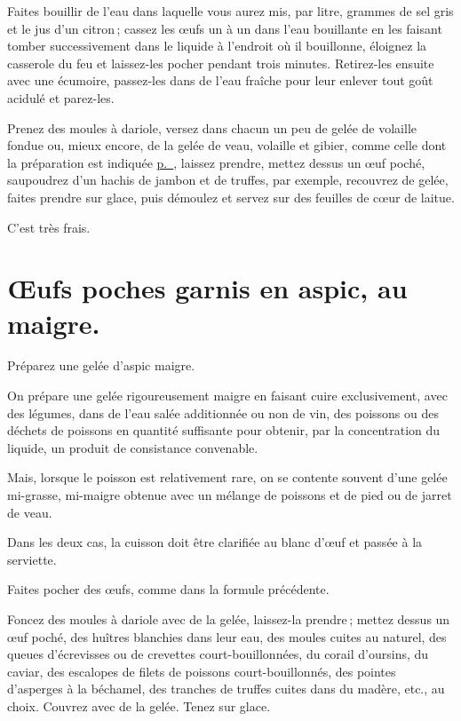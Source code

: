Faites bouillir de l'eau dans laquelle vous aurez mis, par litre, {\mmm}
grammes de sel gris et le jus d'un citron ; cassez les œufs un à un dans l’eau
bouillante en les faisant tomber successivement dans le liquide à l'endroit où
il bouillonne, éloignez la casserole du feu et laissez-les pocher pendant trois
minutes. Retirez-les ensuite avec une écumoire, passez-les dans de l’eau
fraîche pour leur enlever tout goût acidulé et parez-les.

Prenez des moules à dariole, versez dans chacun un peu de gelée de volaille
fondue ou, mieux encore, de la gelée de veau, volaille et gibier, comme celle
dont la préparation est indiquée \hyperlink{p0418}{p. \pageref{pg0418}},
laissez prendre, mettez dessus un œuf poché, saupoudrez d'un hachis de jambon
et de truffes, par exemple, recouvrez de gelée, faites prendre sur glace, puis
démoulez et servez sur des feuilles de cœur de laitue.

C'est très frais.

\section*{\centering Œufs poches garnis en aspic, au maigre.}

Préparez une gelée d'aspic maigre.

On prépare une gelée rigoureusement maigre en faisant cuire exclusivement, avec
des légumes, dans de l'eau salée additionnée ou non de vin, des poissons ou des
déchets de poissons en quantité suffisante pour obtenir, par la concentration
du liquide, un produit de consistance convenable.

Mais, lorsque le poisson est relativement rare, on se contente souvent d'une
gelée mi-grasse, mi-maigre obtenue avec un mélange de poissons et de pied ou
de jarret de veau.

Dans les deux cas, la cuisson doit être clarifiée au blanc d'œuf et passée à la
serviette.

Faites pocher des œufs, comme dans la formule précédente.

Foncez des moules à dariole avec de la gelée, laissez-la prendre ; mettez dessus
un œuf poché, des huîtres blanchies dans leur eau, des moules cuites au
naturel, des queues d'écrevisses ou de crevettes court-bouillonnées, du corail
d'oursins, du caviar, des escalopes de filets de poissons court-bouillonnés,
des pointes d'asperges à la béchamel, des tranches de truffes cuites dans du
madère, etc., au choix. Couvrez avec de la gelée. Tenez sur glace.

